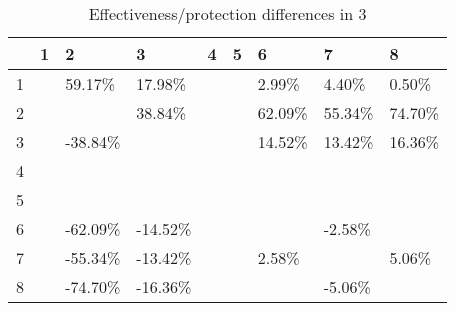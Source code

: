 \begin{table}[ht]
\centering
\begin{tabular}{rllllllll}
  \hline
 & 1 & 2 & 3 & 4 & 5 & 6 & 7 & 8 \\ 
  \hline
1 &  & 59.17\% & 17.98\% &  &  & 2.99\% & 4.40\% & 0.50\% \\ 
  2 &  &  & 38.84\% &  &  & 62.09\% & 55.34\% & 74.70\% \\ 
  3 &  & -38.84\% &  &  &  & 14.52\% & 13.42\% & 16.36\% \\ 
  4 &  &  &  &  &  &  &  &  \\ 
  5 &  &  &  &  &  &  &  &  \\ 
  6 &  & -62.09\% & -14.52\% &  &  &  & -2.58\% &  \\ 
  7 &  & -55.34\% & -13.42\% &  &  & 2.58\% &  & 5.06\% \\ 
  8 &  & -74.70\% & -16.36\% &  &  &  & -5.06\% &  \\ 
   \hline
\end{tabular}
\caption{Effectiveness/protection differences in  3} 
\end{table}
